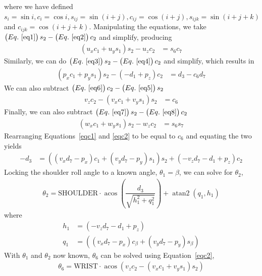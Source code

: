 \documentclass{article}
\DeclareMathOperator{\atantwo}{atan2}
\DeclareMathOperator{\acos}{acos}
\begin{document}
where we have defined $s_i = \sin{i}, c_i = \cos{i}, s_{ij} = \sin{\left(i+j\right)}, c_{ij} = \cos{\left(i+j\right)}, s_{ijk} = \sin{\left(i+j+k\right)}$ and $c_{ijk} = \cos{\left(i+j+k\right)}$.
Manipulating the equations, we take $\left(Eq.~\ref{eq1} \right) s_2 - \left(Eq.~\ref{eq2} \right) c_2$ and simplify, producing
\begin{align}
\left(u_x c_1 + u_y s_1\right) s_2 - u_z c_2 &= s_{6} c_{7} \label{eqc3}
\end{align}
Similarly, we can do $\left(Eq.~\ref{eq3} \right) s_2-\left(Eq.~\ref{eq4}\right) c_2$ and simplify, which results in
\begin{align}
\left(p_x c_1 + p_y s_1 \right) s_2 - \left(- d_{1} + p_z \right) c_2 &= d_3 - c_6 d_7 \label{eqc1}
\end{align}
We can also subtract $\left(Eq.~\ref{eq6} \right) c_2 - \left(Eq.~\ref{eq5} \right) s_2$
\begin{align}
v_z c_2 - \left( v_x c_1 + v_y s_1 \right) s_2 &= c_{6} \label{eqc2}
\end{align}
Finally, we can also subtract $\left(Eq.~\ref{eq7} \right) s_2 - \left(Eq.~\ref{eq8} \right) c_2$
\begin{align}
\left(w_x c_1 + w_y s_1\right) s_2 - w_z c_2 &= s_{6} s_{7} \label{eqc4}
\end{align}
Rearranging Equations~\ref{eqc1} and \ref{eqc2} to be equal to $c_6$ and equating the two yields
\begin{align}
-d_3 &= \left( \left( v_x d_7 - p_x \right) c_1 + \left( v_y d_7 - p_y \right) s_1 \right) s_2 + \left(-v_z d_7 - d_{1} + p_z \right) c_2
\end{align}
Locking the shoulder roll angle to a known angle, $\boxed{\theta_1 = \beta}$, we can solve for $\theta_2$,
\begin{align}
\boxed{\theta_2 = \mbox{SHOULDER} \cdot \acos \left( \dfrac{d_3}{\sqrt{h_1^2 + q_1^2}} \right) + \atantwo(q_1,h_1)}
\end{align}
where
\begin{align}
h_1 &= \left(-v_z d_7 - d_{1} + p_z \right) \\
q_1 &= \left( \left( v_x d_7 - p_x \right) c_{\beta} + \left( v_y d_7 - p_y \right) s_{\beta} \right)
\end{align}
With $\theta_1$ and $\theta_2$ now known, $\theta_6$ can be solved using Equation~\ref{eqc2},
\begin{align}
\boxed{\theta_6 = \mbox{WRIST} \cdot \acos \left(v_z c_2 - \left( v_x c_1 + v_y s_1 \right) s_2 \right)}
\end{align}
\end{document}
